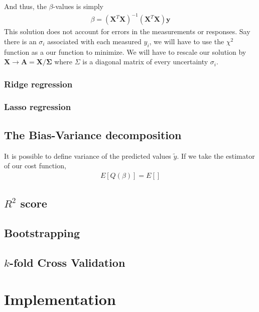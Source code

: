 \documentclass[11pt]{article}
\begin{document}
And thus, the $\beta$-values is simply
\begin{align}
    \beta = \left(\bm{X}^T\bm{X}\right)^{-1}\left(\bm{X}^T\bm{X}\right)\bm{y}
    \label{eq:ols_beta}
\end{align}
This solution does not account for errors in the measurements or responses. Say there is an $\sigma_i$ associated with each measured $y_i$, we will have to use the $\chi^2$ function as a our function to minimize\citep[see notes on regression]{morten-regression}. We will have to rescale our solution by $\bm{X} \rightarrow \bm{A}=\bm{X}/\bm{\Sigma}$ where $\Sigma$ is a diagonal matrix of every uncertainty $\sigma_i$.

\subsubsection{Ridge regression}
\subsubsection{Lasso regression}

\subsection{The Bias-Variance decomposition}
It is possible to define variance of the predicted values $\tilde{y}$. If we take the estimator of our cost function,
\begin{align}
    E[Q(\beta)] = E\left[\right]
\end{align}

\subsection{\texorpdfstring{$R^2$}{R1} score}

\subsection{Bootstrapping}
\subsection{\texorpdfstring{$k$}{k}-fold Cross Validation}

\section{Implementation}
\cite{scikit-learn}
\end{document}

